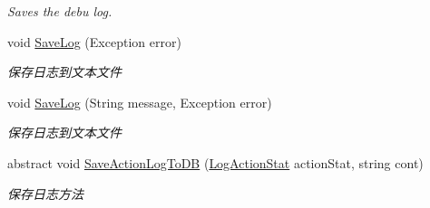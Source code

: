 \begin{DoxyCompactItemize}
\begin{DoxyCompactList}\small\item\em Saves the debu log. \end{DoxyCompactList}\item 
void \mbox{\hyperlink{class_t_net_1_1_service_1_1_game_struct_a10001c5abc7d651258f22e30d64cfb3f}{Save\+Log}} (Exception error)
\begin{DoxyCompactList}\small\item\em 保存日志到文本文件 \end{DoxyCompactList}\item 
void \mbox{\hyperlink{class_t_net_1_1_service_1_1_game_struct_a961c7621869446b0f13f48e2ddd5fae4}{Save\+Log}} (String message, Exception error)
\begin{DoxyCompactList}\small\item\em 保存日志到文本文件 \end{DoxyCompactList}\item 
abstract void \mbox{\hyperlink{class_t_net_1_1_service_1_1_game_struct_aff61ff71c1dd0a5ffef06af3f80f79ca}{Save\+Action\+Log\+To\+DB}} (\mbox{\hyperlink{class_t_net_1_1_service_1_1_game_struct_ac7fb463ce72bdf0b12b015c74d2d58da}{Log\+Action\+Stat}} action\+Stat, string cont)
\begin{DoxyCompactList}\small\item\em 保存日志方法 \end{DoxyCompactList}\end{DoxyCompactItemize}
